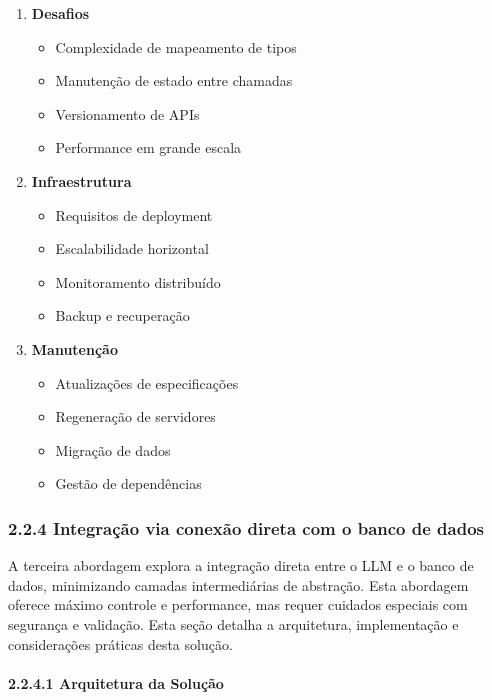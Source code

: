 \documentclass[
]{article}
\providecommand{\tightlist}{%
  \setlength{\itemsep}{0pt}\setlength{\parskip}{0pt}}
\begin{document}
\begin{enumerate}
\def\labelenumi{\arabic{enumi}.}
\item
  \textbf{Desafios}

  \begin{itemize}
  \tightlist
  \item
    Complexidade de mapeamento de tipos
  \item
    Manutenção de estado entre chamadas
  \item
    Versionamento de APIs
  \item
    Performance em grande escala
  \end{itemize}
\item
  \textbf{Infraestrutura}

  \begin{itemize}
  \tightlist
  \item
    Requisitos de deployment
  \item
    Escalabilidade horizontal
  \item
    Monitoramento distribuído
  \item
    Backup e recuperação
  \end{itemize}
\item
  \textbf{Manutenção}

  \begin{itemize}
  \tightlist
  \item
    Atualizações de especificações
  \item
    Regeneração de servidores
  \item
    Migração de dados
  \item
    Gestão de dependências
  \end{itemize}
\end{enumerate}

\subsubsection{2.2.4 Integração via conexão direta com o banco de
dados}\label{integrauxe7uxe3o-via-conexuxe3o-direta-com-o-banco-de-dados}

A terceira abordagem explora a integração direta entre o LLM e o banco
de dados, minimizando camadas intermediárias de abstração. Esta
abordagem oferece máximo controle e performance, mas requer cuidados
especiais com segurança e validação. Esta seção detalha a arquitetura,
implementação e considerações práticas desta solução.

\paragraph{2.2.4.1 Arquitetura da
Solução}\label{arquitetura-da-soluuxe7uxe3o-2}
\end{document}
